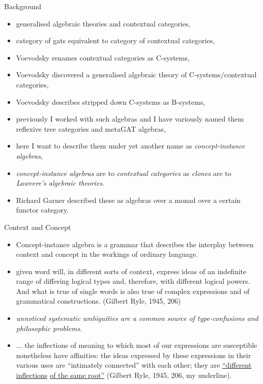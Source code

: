 \begin{frame}{Background}
\begin{itemize}
\item generalised algebraic theories and contextual categories,
\item category of gats equivalent to category of contextual categories,
\item Voevodsky renames contextual categories as C-systems,
\item Voevodsky discovered a generalised algebraic theory of C-systems/contextual categories,
\item Voevodsky describes stripped down  C-systems as B-systems,
\item previously I worked with such algebras and I have variously named them reflexive tree categories and metaGAT algebras,
\item here I want to describe them under yet another name as \textit{concept-instance algebras},
\item \textit{concept-instance algebras} are to \textit{contextual categories} as \textit{clones} are to \textit{Lawvere's  algebraic theories}.
\item Richard Garner described these as algebras over a monad over a certain functor category.
\end{itemize}
\end{frame}

\begin{frame}{Context and Concept}
\begin{itemize}
	\item Concept-instance algebra is a grammar that describes the interplay between context and concept in the workings of ordinary language.
\pause	\item
\begin{tightquote}
[a] given word will, in different sorts of context, express ideas of an indefinite range of differing logical types and, therefore, with different logical powers. And what is true of single words is also true of complex expressions and of grammatical constructions. (Gilbert Ryle, 1945, 206)
\end{tightquote}
\medskip
\pause
\item \textit{unnoticed systematic ambiguities are a common source of type-confusions and philosophic problems}.
\end{itemize}
\end{frame}
\begin{frame}
\begin{itemize}
\item 
\begin{tightquote}
... the inflections of meaning to which most of our expressions are susceptible nonetheless have affinities: the ideas expressed by these expressions in their various uses are “intimately connected” with each other; 
they are \underline{“different inflections} \underline{of the same root”} (Gilbert Ryle, 1945, 206, my underline).
\end{tightquote}

\end{itemize}
\end{frame}


